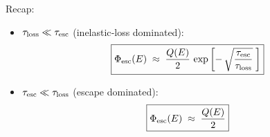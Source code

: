 \begin{solution}
\begin{itemize}
Recap:
\begin{itemize}
\item \(\tau_{\rm loss} \ll \tau_{\rm esc}\) (inelastic‐loss dominated):
\begin{equation}
\boxed{\Phi_{\rm esc}(E)\;\approx\;\frac{Q(E)}{2}\,\exp\left[-\,\sqrt{\frac{\tau_{\rm esc}}{\tau_{\rm loss}}} \; \right]}
\end{equation}
\item \(\tau_{\rm esc} \ll \tau_{\rm loss}\) (escape dominated):
\begin{equation}
\boxed{\Phi_{\rm esc}(E)\;\approx\;\frac{Q(E)}{2}}
\end{equation}
\end{itemize}

\end{itemize}
\end{solution}

